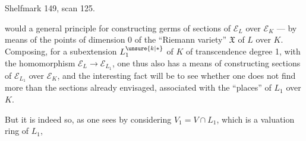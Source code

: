 Shelfmark 149, scan 125.

would a general principle for constructing germs of sections of $\mathcal E_L$ over $\mathcal E_K$ --- by means of the points of dimension 0 of the ``Riemann variety'' $\mathfrak X$ of $L$ over $K$. Composing, for a subextension $L_1^{\unsure{k|*}}$ of $K$ of transcendence degree 1, with the homomorphism $\mathcal E_L\longrightarrow\mathcal E_{L_1}$, one thus also has a means of constructing  sections of $\mathcal E_{L_1}$ over $\mathcal E_K$, and the interesting fact will be to see whether one does not find more  than the sections already envisaged, associated with the ``places'' of $L_1$ over $K$.

But it is indeed so, as one sees by considering $V_1=V\cap L_1$, which is a valuation ring of $L_1$,
